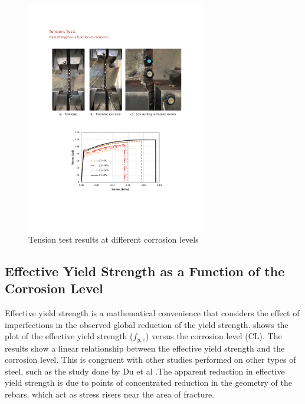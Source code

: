 \begin{figure}[htbp]
	\centering
	\includegraphics[width=0.7\textwidth]{VAC Thesis 2.0/Chapter-4/figs/TensionTest_results_1.pdf}
	\caption{Tension test results at different corrosion levels}
	\label{fig:TensionTestResults_StressStrain}
\end{figure}

\subsection{Effective Yield Strength as a Function of the Corrosion Level}

Effective yield strength is a mathematical convenience that considers the effect of imperfections in the observed global reduction of the yield strength.  shows the plot of the effective yield strength ($f_{y,e}$) versus the corrosion level (CL). The results show a linear relationship between the effective yield strength and the corrosion level. This is congruent with other studies performed on other types of steel, such as the study done by Du et al \cite{Du2005}.The apparent reduction in effective yield strength is due to points of concentrated reduction in the geometry of the rebars, which act as stress risers near the area of fracture.

